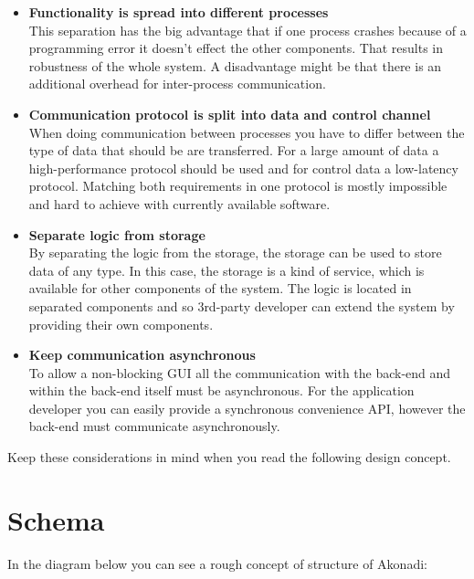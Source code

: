 \documentclass[]{report}
\begin{document}
\begin{itemize}
  \item \textbf{Functionality is spread into different processes}\\
        This separation has the big advantage that if one process crashes because of
        a programming error it doesn't effect the other components. That results in
        robustness of the whole system. A disadvantage might be that there is an additional
        overhead for inter-process communication.
  \item \textbf{Communication protocol is split into data and control channel}\\
        When doing communication between processes you have to differ between the type of data
        that should be are transferred. For a large amount of data a high-performance
        protocol should be used and for control data a low-latency protocol.
        Matching both requirements in one protocol is mostly impossible and hard to
        achieve with currently available software.
  \item \textbf{Separate logic from storage}\\
        By separating the logic from the storage, the storage can be used to store data
        of any type. In this case, the storage is a kind of service, which is available for
        other components of the system. The logic is located in separated components and so
        3rd-party developer can extend the system by providing their own components.
  \item \textbf{Keep communication asynchronous}\\
        To allow a non-blocking GUI all the communication with the back-end and within the
        back-end itself must be asynchronous. For the application developer you can easily
        provide a synchronous convenience API, however the back-end must communicate asynchronously.
\end{itemize}

Keep these considerations in mind when you read the following design concept.

\section{Schema}

In the diagram below you can see a rough concept of structure of Akonadi:
\end{document}
